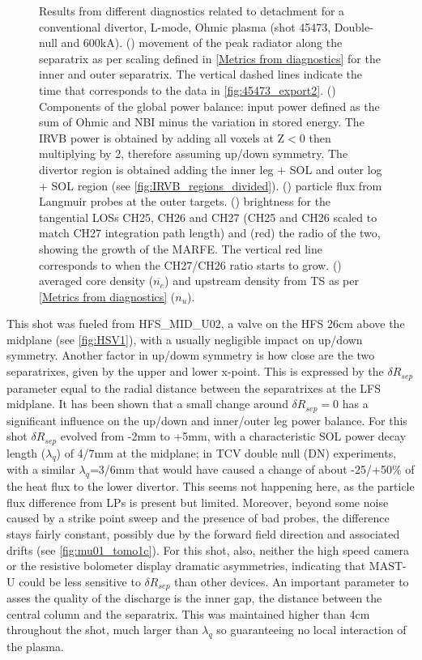\begin{figure}
     \caption{Results from different diagnostics related to detachment for a conventional divertor, L-mode, Ohmic plasma (shot 45473, Double-null and 600kA). () movement of the peak radiator along the separatrix as per scaling defined in \autoref{Metrics from diagnostics} for the inner and outer separatrix. The vertical dashed lines indicate the time that corresponds to the data in \autoref{fig:45473_export2}. () Components of the global power balance: input power defined as the sum of Ohmic and NBI minus the variation in stored energy. The IRVB power is obtained by adding all voxels at Z$<$0 then multiplying by 2, therefore assuming up/down symmetry. The divertor region is obtained adding the inner leg + SOL and outer log + SOL region (see \autoref{fig:IRVB_regions_divided}). () particle flux from Langmuir probes at the outer targets. () brightness for the tangential LOSs CH25, CH26 and CH27 (CH25 and CH26 scaled to match CH27 integration path length) and (red) the radio of the two, showing the growth of the MARFE. The vertical red line corresponds to when the CH27/CH26 ratio starts to grow. () averaged core density ($\overline{n_e}$) and upstream density from TS as per \autoref{Metrics from diagnostics} ($n_u$).}
	\label{fig:mu01_tomo1}
\end{figure}

This shot was fueled from HFS\_MID\_U02, a valve on the HFS 26cm above the midplane (see \autoref{fig:HSV1}), with a usually negligible impact on up/down symmetry. Another factor in up/dowm symmetry is how close are the two separatrixes, given by the upper and lower x-point. This is expressed by the $\delta R_{sep}$ parameter equal to the radial distance between the separatrixes at the LFS midplane. It has been shown that a small change around $\delta R_{sep}=0$ has a significant influence on the up/down and inner/outer leg power balance.\cite{Fevrier2021} For this shot $\delta R_{sep}$ evolved from -2mm to +5mm, with a characteristic SOL power decay length ($\lambda_q$) of 4/7mm at the midplane; in TCV double null (DN) experiments, with a similar $\lambda_q$=3/6mm that would have caused a change of about -25/+50\% of the heat flux to the lower divertor.\cite{Potzel2014} This seems not happening here, as the particle flux difference from LPs is present but limited. Moreover, beyond some noise caused by a strike point sweep and the presence of bad probes, the difference stays fairly constant, possibly due by the forward field direction and associated drifts (see \autoref{fig:mu01_tomo1c}). For this shot, also, neither the high speed camera or the resistive bolometer display dramatic asymmetries, indicating that MAST-U could be less sensitive to $\delta R_{sep}$ than other devices. An important parameter to asses the quality of the discharge is the inner gap, the distance between the central column and the separatrix. This was maintained higher than 4cm throughout the shot, much larger than $\lambda_q$ so guaranteeing no local interaction of the plasma.

